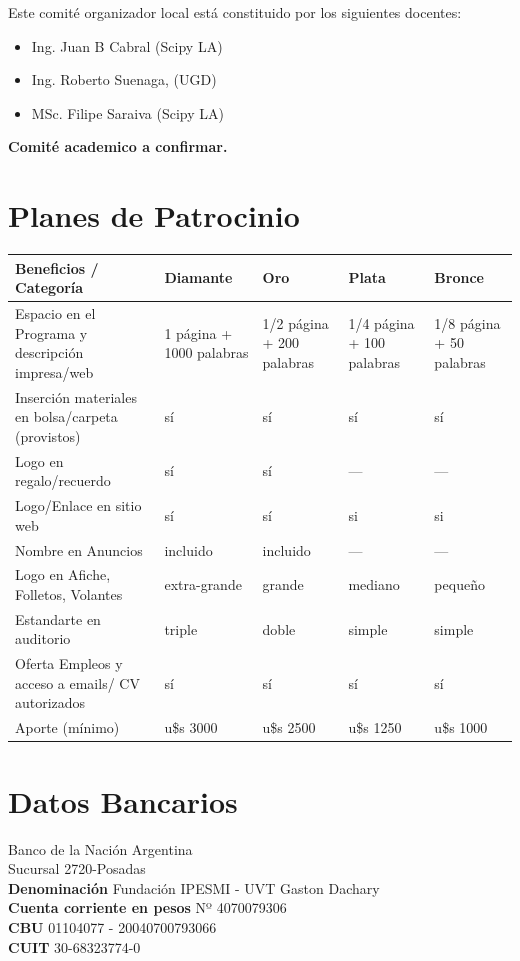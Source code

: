 \documentclass[11pt,a4paper]{report}
\begin{document}
Este comité organizador local está constituido por los siguientes docentes:\\
\begin{itemize}[nolistsep]
    \item Ing. Juan B Cabral (Scipy LA)
    \item Ing. Roberto Suenaga, (UGD)
    \item MSc. Filipe Saraiva (Scipy LA)
\end{itemize}

\textbf{Comité academico a confirmar.}

\section*{Planes de Patrocinio}
\begin{center}

\begin{tabular}{|p{4cm}|p{2.5cm}|p{2.5cm}|p{2.5cm}|p{2.5cm}|}
\hline
Beneficios / Categoría & Diamante & Oro  & Plata & Bronce \\
\hline
Espacio en el Programa y descripción impresa/web & 1 página +
1000 palabras & 1/2 página + 200 palabras & 1/4 página + 100 palabras &  1/8 página + 50 palabras\\
\hline
Inserción materiales en bolsa/carpeta (provistos) & sí & sí & sí & sí \\
\hline
Logo en regalo/recuerdo & sí & sí & --- & --- \\
\hline
Logo/Enlace en sitio web & sí & sí & si & si \\
\hline
Nombre en Anuncios & incluido & incluido & --- & --- \\
\hline
Logo en Afiche, Folletos, Volantes & extra-grande & grande & mediano & pequeño \\
\hline
Estandarte en auditorio & triple & doble & simple & simple \\
\hline
Oferta Empleos y acceso a emails/ CV autorizados  & sí & sí & sí & sí \\
\hline
Aporte (mínimo) & u\$s 3000 & u\$s 2500 & u\$s 1250 & u\$s 1000\\
\hline
\end{tabular}
\end{center}

\section*{Datos Bancarios}
\noindent Banco de la Nación Argentina \\
Sucursal 2720-Posadas \\
\textbf{Denominación} Fundación IPESMI - UVT Gaston Dachary \\
\textbf{Cuenta corriente en pesos} Nº 4070079306 \\
\textbf{CBU} 01104077 - 20040700793066 \\
\textbf{CUIT} 30-68323774-0 \\
\end{document}
